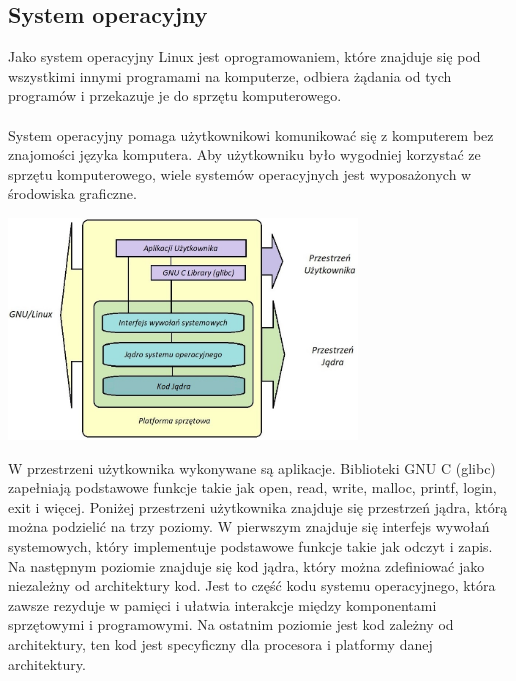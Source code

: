 \documentclass[10pt,a4paper]{report}
\begin{document}
\begin{adjustwidth}{2cm}{2cm}
\section{System operacyjny}
\begin{minipage}{1\linewidth}
Jako system operacyjny Linux jest oprogramowaniem, które znajduje się pod wszystkimi innymi programami na komputerze, odbiera żądania od tych programów i przekazuje je do sprzętu komputerowego. \\ \\
System operacyjny pomaga użytkownikowi komunikować się z komputerem bez znajomości języka komputera. Aby użytkowniku było wygodniej korzystać ze sprzętu komputerowego, wiele systemów operacyjnych jest wyposażonych w środowiska graficzne. \\ 
\end{minipage}
\begin{minipage}{\linewidth}
\vspace{0.3cm}
\begin{center}
  \includegraphics[width=350px]{img/linux-architektura} 
\end{center}
\end{minipage}
\begin{minipage}{1\linewidth}
\vspace{0.3cm}
W przestrzeni użytkownika wykonywane są aplikacje. Biblioteki GNU C (glibc) zapełniają podstawowe funkcje takie jak open, read, write, malloc, printf, login, exit  i więcej. Poniżej przestrzeni użytkownika znajduje się przestrzeń jądra, którą można podzielić na trzy poziomy.
 W pierwszym znajduje się interfejs wywołań systemowych, który implementuje podstawowe funkcje takie jak odczyt i zapis. Na następnym poziomie znajduje się kod jądra, który można zdefiniować jako niezależny od architektury kod. Jest to część kodu systemu operacyjnego, która zawsze rezyduje w pamięci i ułatwia interakcje między komponentami sprzętowymi i programowymi. Na ostatnim poziomie jest kod zależny od architektury,  ten kod jest specyficzny dla procesora i platformy danej architektury.\\ 

\end{minipage}
\end{adjustwidth}
\end{document}

